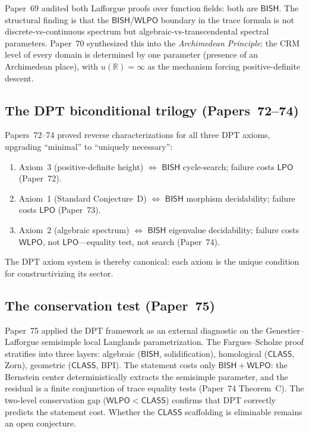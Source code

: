 \documentclass[11pt]{article}
\theoremstyle{plain}
\theoremstyle{definition}
\theoremstyle{remark}
\newcommand{\R}{\mathbb{R}}
\newcommand{\BISH}{\mathsf{BISH}}
\newcommand{\LPO}{\mathsf{LPO}}
\newcommand{\WLPO}{\mathsf{WLPO}}
\newcommand{\CLASS}{\mathsf{CLASS}}
\begin{document}
Paper~69 audited both Lafforgue proofs over function fields:
both are $\BISH$.  The structural finding is that the
$\BISH$/$\WLPO$ boundary in the trace formula is not
discrete-vs-continuous spectrum but algebraic-vs-transcendental
spectral parameters.  Paper~70 synthesized this into the
\emph{Archimedean Principle}: the CRM level of every domain is
determined by one parameter (presence of an Archimedean place),
with $u(\R) = \infty$ as the mechanism forcing positive-definite
descent.

\subsection{The DPT biconditional trilogy (Papers~72--74)}

Papers~72--74 proved reverse characterizations for all three
DPT axioms, upgrading ``minimal'' to ``uniquely necessary'':
\begin{enumerate}
\item Axiom~3 (positive-definite height) $\Leftrightarrow$
  $\BISH$ cycle-search; failure costs $\LPO$ (Paper~72).
\item Axiom~1 (Standard Conjecture~D) $\Leftrightarrow$
  $\BISH$ morphism decidability; failure costs $\LPO$ (Paper~73).
\item Axiom~2 (algebraic spectrum) $\Leftrightarrow$
  $\BISH$ eigenvalue decidability; failure costs $\WLPO$, not
  $\LPO$---equality test, not search (Paper~74).
\end{enumerate}
The DPT axiom system is thereby canonical: each axiom is
the unique condition for constructivizing its sector.

\subsection{The conservation test (Paper~75)}

Paper~75 applied the DPT framework as an external diagnostic on
the Genestier--Lafforgue semisimple local Langlands
parametrization.  The Fargues--Scholze proof stratifies into
three layers: algebraic ($\BISH$, solidification), homological
($\CLASS$, Zorn), geometric ($\CLASS$, BPI).  The statement
costs only $\BISH + \WLPO$: the Bernstein center deterministically
extracts the semisimple parameter, and the residual is a finite
conjunction of trace equality tests (Paper~74 Theorem~C).
The two-level conservation gap ($\WLPO < \CLASS$) confirms that
DPT correctly predicts the statement cost.  Whether the $\CLASS$
scaffolding is eliminable remains an open conjecture.
\end{document}
